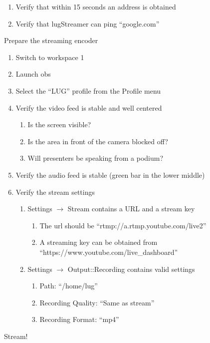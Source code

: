 \documentclass[12pt,letterpaper,oneside]{article}
\newenvironment{checklist}{%
	\begin{list}{}{}%
	\let\olditem\item
	\renewcommand\item{\olditem[$\Box$] }
	}{%
	\end{list}
}
\begin{document}
\begin{enumerate}
\begin{checklist}
\begin{enumerate}
    \item Verify that within 15 seconds an address is obtained
    \item Verify that lugStreamer can ping ``google.com''
    \end{enumerate}
  \item Prepare the streaming encoder
    \begin{enumerate}
    \item Switch to workspace 1
    \item Launch obs
    \item Select the ``LUG'' profile from the Profile menu
    \item Verify the video feed is stable and well centered
      \begin{enumerate}
      \item Is the screen visible?
      \item Is the area in front of the camera blocked off?
      \item Will presenters be speaking from a podium?
      \end{enumerate}
    \item Verify the audio feed is stable (green bar in the lower middle)
    \item Verify the stream settings
      \begin{enumerate}
      \item Settings $\to$ Stream contains a URL and a stream key
        \begin{enumerate}
        \item The url should be ``rtmp://a.rtmp.youtube.com/live2''
        \item A streaming key can be obtained from ``https://www.youtube.com/live\_dashboard''
        \end{enumerate}
      \item Settings $\to$ Output::Recording contains valid settings
        \begin{enumerate}
        \item Path: ``/home/lug''
        \item Recording Quality: ``Same as stream''
        \item Recording Format: ``mp4''
        \end{enumerate}
      \end{enumerate}
    \end{enumerate}
  \end{checklist}
\item Stream!
  \begin{checklist}

\end{checklist}
\end{enumerate}
\end{document}
